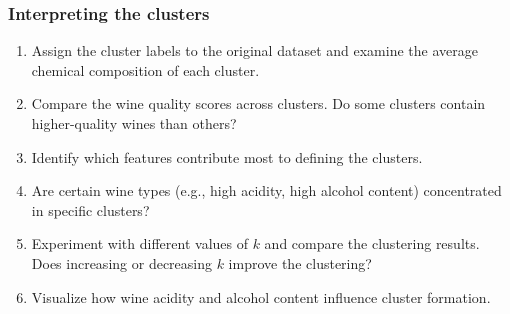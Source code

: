 \documentclass[
]{book}
\providecommand{\tightlist}{%
  \setlength{\itemsep}{0pt}\setlength{\parskip}{0pt}}
\theoremstyle{definition}
\theoremstyle{definition}
\theoremstyle{definition}
\theoremstyle{definition}
\theoremstyle{remark}
\begin{document}
\subsubsection*{Interpreting the clusters}\label{interpreting-the-clusters}

\begin{enumerate}
\def\labelenumi{\arabic{enumi}.}
\setcounter{enumi}{30}
\tightlist
\item
  Assign the cluster labels to the original dataset and examine the average chemical composition of each cluster.\\
\item
  Compare the wine quality scores across clusters. Do some clusters contain higher-quality wines than others?\\
\item
  Identify which features contribute most to defining the clusters.\\
\item
  Are certain wine types (e.g., high acidity, high alcohol content) concentrated in specific clusters?\\
\item
  Experiment with different values of \(k\) and compare the clustering results. Does increasing or decreasing \(k\) improve the clustering?\\
\item
  Visualize how wine acidity and alcohol content influence cluster formation.
\end{enumerate}

  
\end{document}
